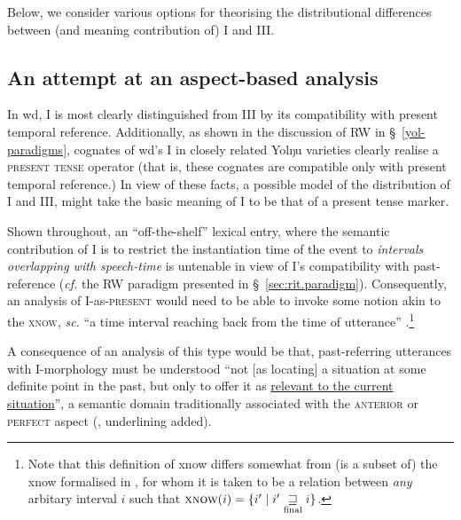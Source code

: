 Below, we consider various options for theorising the distributional differences between (and meaning contribution of) \gls{I} and \gls{III}.


\subsection{An attempt at an aspect-based analysis}

In \acrshort{wd}, \gls{I} is most clearly distinguished from \gls{III} by its compatibility with present temporal reference. Additionally, as shown in the discussion of \acrlong{RW} in \S~\ref{yol-paradigms}, cognates of \acrshort{wd}'s \gls{I} in closely related Yolŋu varieties clearly realise a \textsc{present tense} operator (that is, these cognates are compatible only with present temporal reference.) In view of these facts, a possible model of the distribution of \gls{I} and \gls{III}, might take the basic meaning of \gls{I} to be that of a present tense marker.

Shown throughout, an ``off-the-shelf'' lexical entry, where the semantic contribution of \gls{I} is to restrict the instantiation time of the event to\textit{ intervals overlapping with speech-time} is untenable in view of \gls{I}'s compatibility with past-reference (\textit{cf.} the \acrshort{RW} paradigm presented in \S~\ref{sec:rit.paradigm}). Consequently, an analysis of \gls{I}-as-\textsc{present} would need to be able to invoke some notion akin to the \textsc{\acrfull{xnow}}, \textit{sc.} ``a time interval reaching back from the time of utterance'' \citep[49]{Cover2010}.\footnote{Note that this definition of \acrshort{xnow} differs somewhat from (is a subset of) the \acrshort{xnow} formalised in \citealt[225]{Stump1985}, for whom it is taken to be a relation between \textsl{any} arbitary interval $ i $ such that $ \textsc{xnow}(i) = \{i'\mid i'\underset{\text{final}}{\sqsupseteq} i\}$.}

A consequence of an analysis of this type would be that, past-referring utterances with \gls{I}-morphology must be understood ``not [as locating] a situation at some definite point in the past, but only to offer it as \ul{relevant to the current situation}'', a semantic domain traditionally associated with the \textsc{anterior} or \textsc{perfect} aspect (\citealp[62]{Bybee1994}, underlining added).



